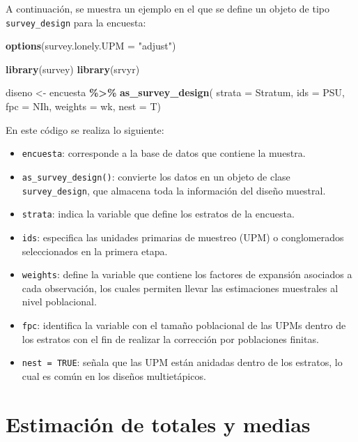 \documentclass[
  spanish,
  12pt,
]{book}
\newenvironment{Shaded}{\begin{snugshade}}{\end{snugshade}}
\newcommand{\AttributeTok}[1]{\textcolor[rgb]{0.13,0.29,0.53}{#1}}
\newcommand{\FunctionTok}[1]{\textcolor[rgb]{0.13,0.29,0.53}{\textbf{#1}}}
\newcommand{\NormalTok}[1]{#1}
\newcommand{\OtherTok}[1]{\textcolor[rgb]{0.56,0.35,0.01}{#1}}
\newcommand{\SpecialCharTok}[1]{\textcolor[rgb]{0.81,0.36,0.00}{\textbf{#1}}}
\newcommand{\StringTok}[1]{\textcolor[rgb]{0.31,0.60,0.02}{#1}}
\providecommand{\tightlist}{%
  \setlength{\itemsep}{0pt}\setlength{\parskip}{0pt}}
\begin{document}
A continuación, se muestra un ejemplo en el que se define un objeto de tipo \texttt{survey\_design} para la encuesta:

\begin{Shaded}
\begin{Highlighting}[]
\FunctionTok{options}\NormalTok{(}\AttributeTok{survey.lonely.UPM =} \StringTok{"adjust"}\NormalTok{) }

\FunctionTok{library}\NormalTok{(survey)}
\FunctionTok{library}\NormalTok{(srvyr)}

\NormalTok{diseno }\OtherTok{\textless{}{-}}\NormalTok{ encuesta }\SpecialCharTok{\%\textgreater{}\%} 
          \FunctionTok{as\_survey\_design}\NormalTok{(}
            \AttributeTok{strata =}\NormalTok{ Stratum,  }
            \AttributeTok{ids =}\NormalTok{ PSU,   }
            \AttributeTok{fpc =}\NormalTok{ NIh,}
            \AttributeTok{weights =}\NormalTok{ wk,      }
            \AttributeTok{nest =}\NormalTok{ T)}
\end{Highlighting}
\end{Shaded}

En este código se realiza lo siguiente:

\begin{itemize}
\tightlist
\item
  \texttt{encuesta}: corresponde a la base de datos que contiene la muestra.
\item
  \texttt{as\_survey\_design()}: convierte los datos en un objeto de clase \texttt{survey\_design}, que almacena toda la información del diseño muestral.
\item
  \texttt{strata}: indica la variable que define los estratos de la encuesta.
\item
  \texttt{ids}: especifica las unidades primarias de muestreo (UPM) o conglomerados seleccionados en la primera etapa.
\item
  \texttt{weights}: define la variable que contiene los factores de expansión asociados a cada observación, los cuales permiten llevar las estimaciones muestrales al nivel poblacional.
\item
  \texttt{fpc}: identifica la variable con el tamaño poblacional de las UPMs dentro de los estratos con el fin de realizar la corrección por poblaciones finitas.
\item
  \texttt{nest\ =\ TRUE}: señala que las UPM están anidadas dentro de los estratos, lo cual es común en los diseños multietápicos.
\end{itemize}

\section{Estimación de totales y medias}\label{estimaciuxf3n-de-totales-y-medias}
\end{document}
